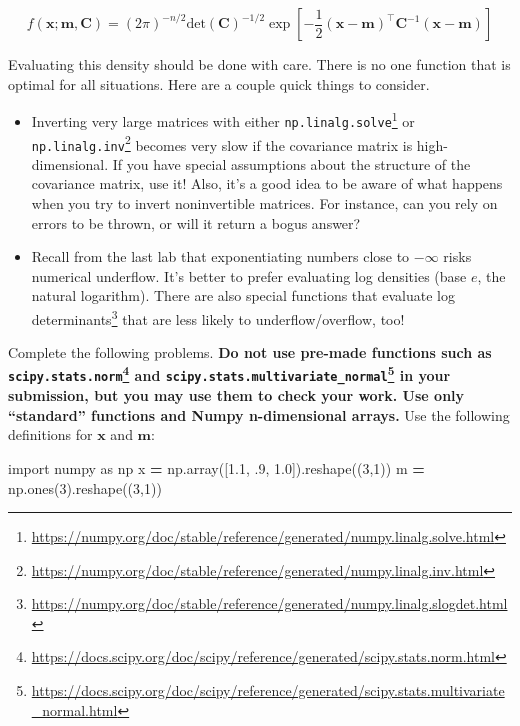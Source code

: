 \documentclass[
  12pt,
  krantz2]{krantz}
\makeatletter
\newenvironment{Shaded}{\begin{snugshade}}{\end{snugshade}}
\newcommand{\DecValTok}[1]{\textcolor[rgb]{0.06,0.06,0.06}{#1}}
\newcommand{\FloatTok}[1]{\textcolor[rgb]{0.06,0.06,0.06}{#1}}
\newcommand{\ImportTok}[1]{#1}
\newcommand{\NormalTok}[1]{#1}
\newcommand{\OperatorTok}[1]{\textcolor[rgb]{0.43,0.43,0.43}{\textbf{#1}}}
\renewcommand{\href}[2]{#2\footnote{\url{#1}}}
\newenvironment{kframe}{%
\medskip{}
\setlength{\fboxsep}{.8em}
 \def\at@end@of@kframe{}%
 \ifinner\ifhmode%
  \def\at@end@of@kframe{\end{minipage}}%
  \begin{minipage}{\columnwidth}%
 \fi\fi%
 \def\FrameCommand##1{\hskip\@totalleftmargin \hskip-\fboxsep
 \colorbox{shadecolor}{##1}\hskip-\fboxsep
     \hskip-\linewidth \hskip-\@totalleftmargin \hskip\columnwidth}%
 \MakeFramed {\advance\hsize-\width
   \@totalleftmargin\z@ \linewidth\hsize
   \@setminipage}}%
 {\par\unskip\endMakeFramed%
 \at@end@of@kframe}
\renewenvironment{Shaded}{\begin{kframe}}{\end{kframe}}
\makeatother
\begin{document}
\begin{equation} 
f(\mathbf{x}; \mathbf{m}, \mathbf{C}) = (2\pi)^{-n/2}\text{det}\left( \mathbf{C} \right)^{-1/2}\exp\left[- \frac{1}{2} (\mathbf{x}- \mathbf{m})^\intercal \mathbf{C}^{-1} (\mathbf{x}- \mathbf{m}) \right]
\end{equation}

Evaluating this density should be done with care. There is no one function that is optimal for all situations. Here are a couple quick things to consider.

\begin{itemize}
\item
  Inverting very large matrices with either \href{https://numpy.org/doc/stable/reference/generated/numpy.linalg.solve.html}{\texttt{np.linalg.solve}} or \href{https://numpy.org/doc/stable/reference/generated/numpy.linalg.inv.html}{\texttt{np.linalg.inv}} becomes very slow if the covariance matrix is high-dimensional. If you have special assumptions about the structure of the covariance matrix, use it! Also, it's a good idea to be aware of what happens when you try to invert noninvertible matrices. For instance, can you rely on errors to be thrown, or will it return a bogus answer?
\item
  Recall from the last lab that exponentiating numbers close to \(-\infty\) risks numerical underflow. It's better to prefer evaluating log densities (base \(e\), the natural logarithm). There are also \href{https://numpy.org/doc/stable/reference/generated/numpy.linalg.slogdet.html}{special functions that evaluate log determinants} that are less likely to underflow/overflow, too!
\end{itemize}

Complete the following problems. \textbf{Do not use pre-made functions such as \href{https://docs.scipy.org/doc/scipy/reference/generated/scipy.stats.norm.html}{\texttt{scipy.stats.norm}} and \href{https://docs.scipy.org/doc/scipy/reference/generated/scipy.stats.multivariate_normal.html}{\texttt{scipy.stats.multivariate\_normal}} in your submission, but you may use them to check your work. Use only ``standard'' functions and Numpy n-dimensional arrays.} Use the following definitions for \(\mathbf{x}\) and \(\mathbf{m}\):

\begin{Shaded}
\begin{Highlighting}[]
\ImportTok{import}\NormalTok{ numpy }\ImportTok{as}\NormalTok{ np}
\NormalTok{x }\OperatorTok{=}\NormalTok{ np.array([}\FloatTok{1.1}\NormalTok{, }\FloatTok{.9}\NormalTok{, }\FloatTok{1.0}\NormalTok{]).reshape((}\DecValTok{3}\NormalTok{,}\DecValTok{1}\NormalTok{))}
\NormalTok{m }\OperatorTok{=}\NormalTok{ np.ones(}\DecValTok{3}\NormalTok{).reshape((}\DecValTok{3}\NormalTok{,}\DecValTok{1}\NormalTok{))}
\end{Highlighting}
\end{Shaded}
\end{document}

